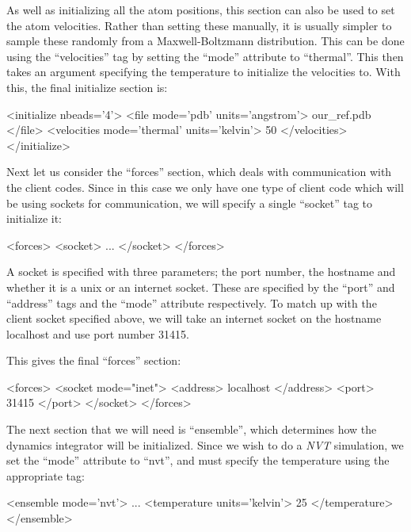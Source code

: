 \documentclass[11pt,english,fleqn]{report}
\newenvironment{code}{%
\footnotesize 
\verbatim
}{
\endverbatim
\normalsize
}
\begin{document}
As well as initializing all the atom positions, this section
can also be used to set the atom velocities. Rather than setting these manually,
it is usually simpler to sample these randomly from a Maxwell-Boltzmann
distribution. This can be done using the
{}``velocities'' tag by setting the {}``mode'' attribute to {}``thermal''.
This then takes an argument specifying the temperature to initialize the
velocities to. With this, the final initialize section is:

\begin{code}
<initialize nbeads='4'>
   <file mode='pdb' units='angstrom'> our_ref.pdb </file>
   <velocities mode='thermal' units='kelvin'> 50 </velocities>
</initialize>
\end{code}

Next let us consider the {}``forces'' section, which deals with communication
with the client codes. Since in this case we only have one type of
client code which will be using sockets for communication, we will
specify a single {}``socket'' tag to initialize it:

\begin{code}
<forces>
   <socket>
      ...
   </socket>
</forces>
\end{code}

A socket is specified with three parameters; the port number, the
hostname and whether it is a unix or an internet socket. 
These are specified by the {}``port'' and {}``address'' tags
and the {}``mode'' attribute respectively.
To match up with the client socket specified above,
we will take an internet socket on the hostname localhost and
use port number 31415. 

This gives the final {}``forces'' section:

\begin{code}
<forces>
   <socket mode="inet">
      <address> localhost </address>
      <port> 31415 </port>
   </socket>
</forces>
\end{code}

The next section that we will need is {}``ensemble'', which determines
how the dynamics integrator will be initialized. Since we wish to
do a \emph{NVT} simulation, we set the {}``mode'' attribute to {}``nvt'',
and must specify the temperature using the appropriate tag:

\begin{code}
<ensemble mode='nvt'>
   ...
   <temperature units='kelvin'> 25 </temperature>
</ensemble>
\end{code}
\end{document}

